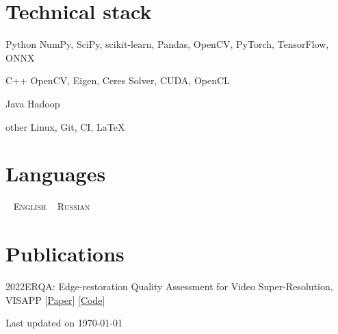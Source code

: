 \documentclass{tccv}
\newcommand{\updateinfo}[1][\today]{\par\vfill\hfill{\scriptsize\color{darkergray}Last updated on #1}}
\begin{document}
\section{Technical stack}

\begin{factlist}

\item{Python}
     {NumPy, SciPy, scikit-learn, Pandas, OpenCV, PyTorch, TensorFlow, ONNX}

\item{C++}
     {OpenCV, Eigen, Ceres Solver, CUDA, OpenCL}

\item{Java}
     {Hadoop}

\item{other}
     {Linux, Git, CI, \LaTeX}

\end{factlist}


\section{Languages}

\faAngleDoubleRight~ \textsc{English}\qquad
\faAngleDoubleRight~ \textsc{Russian}

\section{Publications}

\begin{factlist}
     \item{2022}{ERQA: Edge-restoration Quality Assessment for Video Super-Resolution, VISAPP [\href{https://arxiv.org/abs/2110.09992}{Paper}] [\href{https://github.com/msu-video-group/ERQA}{Code}]}
\end{factlist}

\updateinfo
\end{document}
